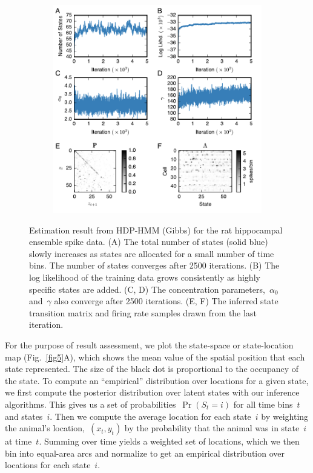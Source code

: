 \begin{figure}
\centering
\begin{subfigure}[t]{5.0in}
\includegraphics[width=\textwidth]{figures/ch5/Fig6}
\end{subfigure}
\caption{Estimation result from HDP-HMM (Gibbs) for the rat hippocampal ensemble spike data. (A) The total number of states (solid blue) slowly increases as states are allocated for a small number of time bins. The number of states converges after 2500 iterations. (B) The log likelihood of the training data grows consistently as highly specific states are added. (C, D) The concentration parameters,~$\alpha_0$ and~$\gamma$ also converge after 2500 iterations. (E, F) The inferred  state transition matrix and firing rate samples drawn from the last iteration.
}
\label{fig6}
\end{figure}

For the purpose of result assessment, we plot  the state-space or state-location map  (Fig.~\ref{fig5}A), which shows the mean value of the spatial position that each state represented. The size of the black dot is proportional to the occupancy of the state. 
To compute an ``empirical'' distribution over locations for a given state, we first compute the posterior distribution over latent states with our inference algorithms. This gives us a set of probabilities~$\Pr(S_t=i)$ for all time bins~$t$ and states~$i$. Then we compute the average location for each state~$i$ by weighting the animal's location,~$(x_t,y_t)$ by the probability that the animal was in state~$i$ at time~$t$. Summing over time yields a weighted set of locations, which we then bin into equal-area arcs and normalize to get an empirical distribution over locations for each state~$i$. 

